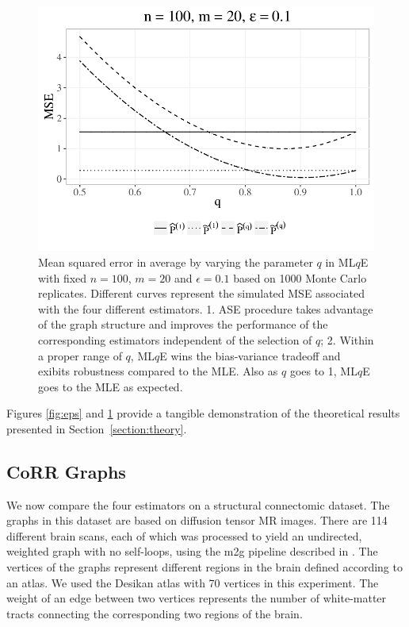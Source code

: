 \documentclass[a4paper]{article}
\begin{document}
\begin{figure}[!htb]
\centering
\includegraphics[width=1\textwidth]{sim_q.pdf}
\caption{Mean squared error in average by varying the parameter $q$ in ML$q$E with fixed $n = 100$, $m = 20$ and $\epsilon = 0.1$ based on 1000 Monte Carlo replicates. Different curves represent the simulated MSE associated with the four different estimators.
1. ASE procedure takes advantage of the graph structure and improves the performance of the corresponding estimators independent of the selection of $q$;
2. Within a proper range of $q$, ML$q$E wins the bias-variance tradeoff and exibits robustness compared to the MLE. Also as $q$ goes to 1, ML$q$E goes to the MLE as expected.}
\label{fig:q}
\end{figure}

Figures \ref{fig:eps} and \ref{fig:q} provide a tangible demonstration of the theoretical results presented in Section~\ref{section:theory}.


\subsection{CoRR Graphs}
\label{section:real_data}

We now compare the four estimators on a structural connectomic dataset. The graphs in this dataset are based on diffusion tensor MR images. There are 114 different brain scans, each of which was processed to yield an undirected, weighted graph with no self-loops, using the m2g pipeline described in \citep{kiar2016ndmg}. The vertices of the graphs represent different regions in the brain defined according to an atlas. We used the Desikan atlas with 70 vertices in this experiment. The weight of an edge between two vertices represents the number of white-matter tracts connecting the corresponding two regions of the brain.
\end{document}
